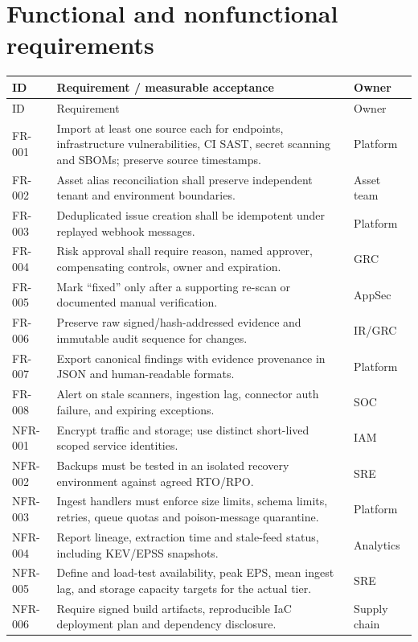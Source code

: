 \documentclass[11pt,oneside]{report}
\begin{document}
\section{Functional and nonfunctional requirements}
\begin{longtable}{P{0.15\textwidth}P{0.60\textwidth}P{0.17\textwidth}}
\toprule ID & Requirement / measurable acceptance & Owner\\\midrule\endfirsthead
\toprule ID & Requirement & Owner\\\midrule\endhead
FR-001 & Import at least one source each for endpoints, infrastructure vulnerabilities, CI SAST, secret scanning and SBOMs; preserve source timestamps. & Platform\\
FR-002 & Asset alias reconciliation shall preserve independent tenant and environment boundaries. & Asset team\\
FR-003 & Deduplicated issue creation shall be idempotent under replayed webhook messages. & Platform\\
FR-004 & Risk approval shall require reason, named approver, compensating controls, owner and expiration. & GRC\\
FR-005 & Mark ``fixed'' only after a supporting re-scan or documented manual verification. & AppSec\\
FR-006 & Preserve raw signed/hash-addressed evidence and immutable audit sequence for changes. & IR/GRC\\
FR-007 & Export canonical findings with evidence provenance in JSON and human-readable formats. & Platform\\
FR-008 & Alert on stale scanners, ingestion lag, connector auth failure, and expiring exceptions. & SOC\\
NFR-001 & Encrypt traffic and storage; use distinct short-lived scoped service identities. & IAM\\
NFR-002 & Backups must be tested in an isolated recovery environment against agreed RTO/RPO. & SRE\\
NFR-003 & Ingest handlers must enforce size limits, schema limits, retries, queue quotas and poison-message quarantine. & Platform\\
NFR-004 & Report lineage, extraction time and stale-feed status, including KEV/EPSS snapshots. & Analytics\\
NFR-005 & Define and load-test availability, peak EPS, mean ingest lag, and storage capacity targets for the actual tier. & SRE\\
NFR-006 & Require signed build artifacts, reproducible IaC deployment plan and dependency disclosure. & Supply chain\\
\bottomrule\end{longtable}
\end{document}
